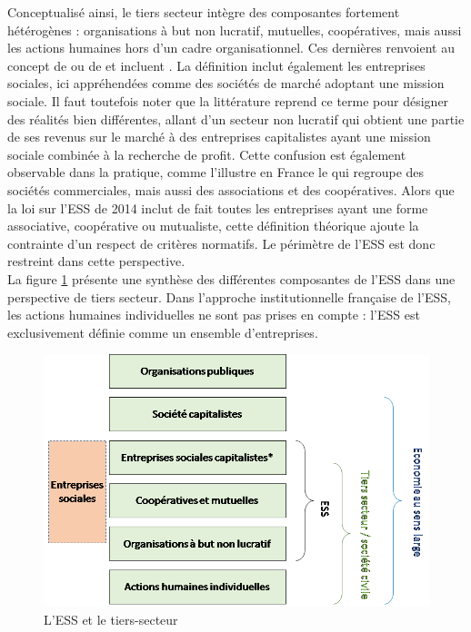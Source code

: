             Conceptualisé ainsi, le tiers secteur intègre des composantes fortement hétérogènes : organisations à but non lucratif, mutuelles, coopératives, mais aussi les actions humaines hors d’un cadre organisationnel. Ces dernières renvoient au concept de  ou de  et incluent   \parencite{salamon2016beyond}. La définition inclut également les entreprises sociales, ici appréhendées comme des sociétés de marché adoptant une mission sociale. Il faut toutefois noter que la littérature reprend ce terme pour désigner des réalités bien différentes, allant d’un secteur non lucratif qui obtient une partie de ses revenus sur le marché à des entreprises capitalistes ayant une mission sociale combinée à la recherche de profit. Cette confusion est également observable dans la pratique, comme l’illustre en France le \mouves qui regroupe des sociétés commerciales, mais aussi des associations et des coopératives. Alors que la loi sur l’ESS de 2014 inclut de fait toutes les entreprises ayant une forme associative, coopérative ou mutualiste, cette définition théorique ajoute la contrainte d’un respect de critères normatifs. Le périmètre de l’ESS est donc restreint dans cette perspective.  \\

            La figure \ref{fig:tierssecteur} présente une synthèse des différentes composantes de l’ESS dans une perspective de tiers secteur. Dans l’approche institutionnelle française de l’ESS, les actions humaines individuelles ne sont pas prises en compte : l’ESS est exclusivement définie comme un ensemble d’entreprises.

             \begin{figure}[ht]
                 \centering
                 \includegraphics[width= 0.8\linewidth]{fig/tierssecteur.png}
                 \caption{L'ESS et le tiers-secteur}
                 \label{fig:tierssecteur}
             \end{figure}

